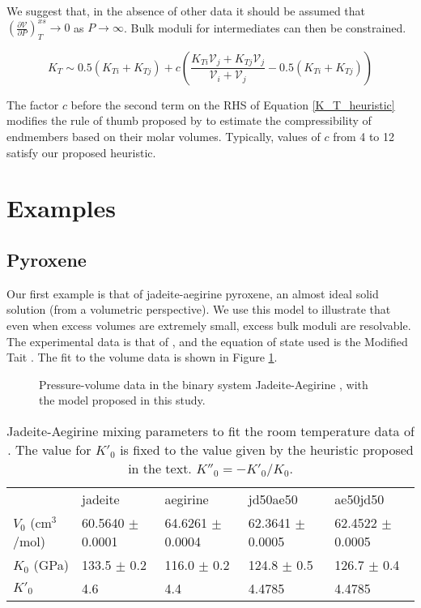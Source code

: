 \documentclass[review]{elsarticle}
\begin{document}
We suggest that, in the absence of other data it should be assumed that $\left( \frac{\partial \mathcal{V}}{\partial P} \right)_T^{xs} \rightarrow 0$ as $P \rightarrow \infty$. Bulk moduli for intermediates can then be constrained. 

\begin{equation}
  K_{T} \sim 0.5(K_{Ti} + K_{Tj}) + c \left(\frac{K_{Ti}\mathcal{V}_{j} + K_{Tj}\mathcal{V}_{j}}{\mathcal{V}_{i} + \mathcal{V}_{j}} - 0.5(K_{Ti} + K_{Tj})\right)
  \label{K_T_heuristic}
\end{equation}

The factor $c$ before the second term on the RHS of Equation \ref{K_T_heuristic} modifies the rule of thumb proposed by \cite{AA1970} to estimate the compressibility of endmembers based on their molar volumes. Typically, values of $c$ from 4 to 12 satisfy our proposed heuristic.

\section{Examples}
\subsection{Pyroxene}
Our first example is that of jadeite-aegirine pyroxene, an almost ideal solid solution (from a volumetric perspective). We use this model to illustrate that even when excess volumes are extremely small, excess bulk moduli are resolvable. The experimental data is that of \cite{NBLBT2006}, and the equation of state used is the Modified Tait \citep{HP2011}. The fit to the volume data is shown in Figure \ref{fig:PV_jadeite_aegirine}.

\begin{figure}[ht!]
  \centering
  \caption{Pressure-volume data in the binary system Jadeite-Aegirine \citep{NBLBT2006}, with the model proposed in this study.}
  \label{fig:PV_jadeite_aegirine}
\end{figure}

\begin{table}[]
\centering
\caption{Jadeite-Aegirine mixing parameters to fit the room temperature data of \cite{NBLBT2006}. The value for $K'_0$ is fixed to the value given by the heuristic proposed in the text. $K''_0 = -K'_0/K_0$.}
\label{tab:jd_aeg}
\begin{tabular}{lllll}
                   & jadeite              & aegirine             & jd50ae50             & ae50jd50             \\
$V_0$ (cm$^3$/mol) & 60.5640 $\pm$ 0.0001 & 64.6261 $\pm$ 0.0004 & 62.3641 $\pm$ 0.0005 & 62.4522 $\pm$ 0.0005 \\
$K_0$ (GPa)        & 133.5 $\pm$ 0.2      & 116.0 $\pm$ 0.2      & 124.8 $\pm$ 0.5      & 126.7 $\pm$ 0.4      \\
$K'_0$             & 4.6                  & 4.4                  & 4.4785               & 4.4785              
\end{tabular}
\end{table}
\end{document}
